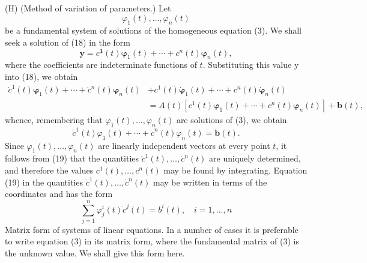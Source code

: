 \documentclass[10pt,a5paper]{book}
\theoremstyle{plain}
\theoremstyle{definition}
\theoremstyle{remark}
\begin{document}
(H) (Method of variation of parameters.) Let
\[
\varphi_{1}(t), \ldots, \varphi_{n}(t)
\]
be a fundamental system of solutions of the homogeneous equation (3). We shall seek a solution of (18) in the form
\[
\mathbf{y}=c^{\mathbf{1}}(t) \boldsymbol{\varphi}_{1}(t)+\cdots+c^{n}(t) \boldsymbol{\varphi}_{n}(t),
\]
where the coefficients are indeterminate functions of $t$. Substituting this value y into (18), we obtain
\[
\begin{aligned}
\dot{c}^{1}(t) \boldsymbol{\varphi}_{1}(t)+\cdots+\dot{c}^{n}(t) \boldsymbol{\varphi}_{n}(t) & +c^{1}(t) \dot{\boldsymbol{\varphi}}_{1}(t)+\cdots+c^{n}(t) \dot{\boldsymbol{\varphi}}_{n}(t) \\
& =A(t)\left[c^{1}(t) \boldsymbol{\varphi}_{1}(t)+\cdots+c^{n}(t) \boldsymbol{\varphi}_{n}(t)\right]+\mathbf{b}(t),
\end{aligned}
\]
whence, remembering that $\varphi_{1}(t), \ldots, \varphi_{n}(t)$ are solutions of (3), we obtain
\begin{equation*}
\dot{c}^{1}(t) \varphi_{1}(t)+\cdots+\dot{c}^{n}(t) \varphi_{n}(t)=\mathbf{b}(t) . \tag{19}
\end{equation*}
Since $\varphi_{1}(t), \ldots, \varphi_{n}(t)$ are linearly independent vectors at every point $t$, it follows from (19) that the quantities $\dot{c}^{1}(t), \ldots, \dot{c}^{n}(t)$ are uniquely determined, and therefore the values $c^{1}(t), \ldots, c^{n}(t)$ may be found by integrating. Equation (19) in the quantities $\dot{c}^{1}(t), \ldots, \dot{c}^{n}(t)$ may be written in terms of the coordinates and has the form
\[
\sum_{j=1}^{n} \varphi_{j}^{i}(t) \dot{c}^{j}(t)=b^{i}(t), \quad i=1, \ldots, n
\]
Matrix form of systems of linear equations. In a number of cases it is preferable to write equation (3) in its matrix form, where the fundamental matrix of (3) is the unknown value. We shall give this form here.
\end{document}
